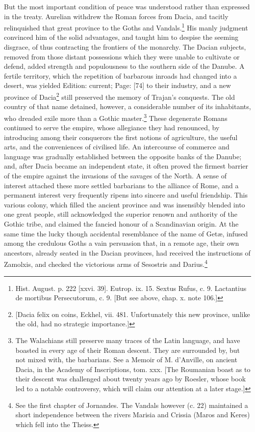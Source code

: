 But the most important condition of peace was understood rather than expressed in the treaty. Aurelian withdrew the Roman forces from Dacia, and tacitly relinquished that great province to the Goths and Vandals.\footnote{Hist. August. p. 222 [xxvi. 39]. Eutrop. ix. 15. Sextus Rufus, c. 9. Lactantius de mortibus Persecutorum, c. 9. [But see above, chap. x. note 106.]} His manly judgment convinced him of the solid advantages, and taught him to despise the seeming disgrace, of thus contracting the frontiers of the monarchy. The Dacian subjects, removed from those distant possessions which they were unable to cultivate or defend, added strength and populousness to the southern side of the Danube. A fertile territory, which the repetition of barbarous inroads had changed into a desert, was yielded Edition: current; Page: [74] to their industry, and a new province of Dacia\footnote{[Dacia felix on coins, Eckhel, vii. 481. Unfortunately this new province, unlike the old, had no strategic importance.]} still preserved the memory of Trajan\texthebrew{}’s conquests. The old country of that name detained, however, a considerable number of its inhabitants, who dreaded exile more than a Gothic master.\footnote{The Walachians still preserve many traces of the Latin language, and have boasted in every age of their Roman descent. They are surrounded by, but not mixed with, the barbarians. See a Memoir of M. d\texthebrew{}’Anville, on ancient Dacia, in the Academy of Inscriptions, tom. xxx. [The Roumanian boast as to their descent was challenged about twenty years ago by Roesler, whose book led to a notable controversy, which will claim our attention at a later stage.]} These degenerate Romans continued to serve the empire, whose allegiance they had renounced, by introducing among their conquerors the first notions of agriculture, the useful arts, and the conveniences of civilised life. An intercourse of commerce and language was gradually established between the opposite banks of the Danube; and, after Dacia became an independent state, it often proved the firmest barrier of the empire against the invasions of the savages of the North. A sense of interest attached these more settled barbarians to the alliance of Rome, and a permanent interest very frequently ripens into sincere and useful friendship. This various colony, which filled the ancient province and was insensibly blended into one great people, still acknowledged the superior renown and authority of the Gothic tribe, and claimed the fancied honour of a Scandinavian origin. At the same time the lucky though accidental resemblance of the name of Getæ, infused among the credulous Goths a vain persuasion that, in a remote age, their own ancestors, already seated in the Dacian provinces, had received the instructions of Zamolxis, and checked the victorious arms of Sesostris and Darius.\footnote{See the first chapter of Jornandes. The Vandals however (c. 22) maintained a short independence between the rivers Marisia and Crissia (Maros and Keres) which fell into the Theiss.}


